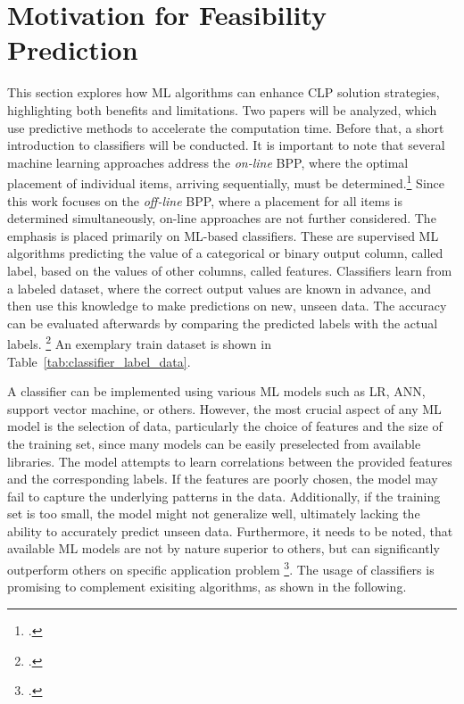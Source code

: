 \chapter{Motivation for Feasibility Prediction}
\label{sec:motivation_feasibility_prediction}
This section explores how \gls{ML} algorithms can enhance \gls{CLP} solution strategies,
highlighting both benefits and limitations. Two papers will be
analyzed, which use predictive methods to accelerate the computation time. Before that,
a short introduction to classifiers will be conducted. It is important to note that
several machine learning approaches address the \textit{on-line} \gls{BPP}, where the optimal placement
of individual items, arriving sequentially, must be determined.\footcite[cf.][p. 1]{ali_-line_2022}
Since this work focuses on the \textit{off-line} \gls{BPP}, where a placement for all items is determined
simultaneously, on-line approaches are not further considered. The emphasis is placed primarily
on \gls{ML}-based classifiers. These are supervised \gls{ML} algorithms predicting the
value of a categorical or binary output column, called label, based on the
values of other columns, called features. Classifiers learn from a labeled dataset,
where the correct output values are known in advance, and then use this knowledge to
make predictions on new, unseen data. The accuracy can be evaluated afterwards by comparing
the predicted labels with the actual labels. \footcite[cf.][]{kotsiantis_supervised_2007}
An exemplary train dataset is shown in Table~\ref{tab:classifier_label_data}.



A classifier can be implemented using various \gls{ML} models such as \gls{LR},
\gls{ANN}, support vector machine, or others. However, the most crucial aspect of any
\gls{ML} model is the selection of data, particularly the choice of features and
the size of the training set, since many models can be easily preselected from available
libraries. The model attempts to learn correlations between the provided features
and the corresponding labels. If the features are poorly chosen, the model may fail
to capture the underlying patterns in the data. Additionally, if the training set
is too small, the model might not generalize well, ultimately lacking the ability
to accurately predict unseen data. Furthermore, it needs to be noted, that available
\gls{ML} models are not by nature superior to others, but can significantly outperform
others on specific application problem \footcite[cf.][pp. 250, 264]{kotsiantis_supervised_2007}.
The usage of classifiers is promising to complement exisiting algorithms, as shown in the following.

